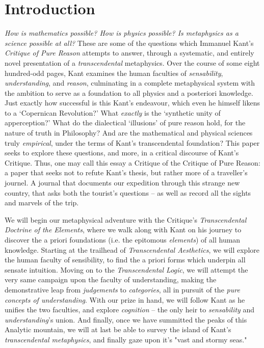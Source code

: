 \section*{Introduction}
\emph{How is mathematics possible? How is physics possible? Is metaphysics as a science possible at all?} These are some of the questions which Immanuel Kant's \emph{Critique of Pure Reason} attempts to answer, through a systematic, and entirely novel presentation of a \emph{transcendental} metaphysics. Over the course of some eight hundred-odd pages, Kant examines the human faculties of \emph{sensability}, \emph{understanding}, and \emph{reason}, culminating in a complete metaphysical system with the ambition to serve as a foundation to all physics and a posteriori knowledge. Just exactly how successful is this Kant's endeavour, which even he himself likens to a `Copernican Revolution?' What \emph{exactly} is the `synthetic unity of apperception?' What do the dialectical `illusions' of pure reason hold, for the nature of truth in Philosophy? And are the mathematical and physical sciences truly \emph{empirical}, under the terms of Kant's transcendental foundation? This paper seeks to explore these questions, and more, in a critical discourse of Kant's Critique. Thus, one may call this essay a Critique of the Critique of Pure Reason: a paper that seeks not to refute Kant's thesis, but rather more of a traveller's journel. A journal that documents our expedition through this strange new country, that asks both the tourist's questions -- as well as record all the sights and marvels of the trip.

We will begin our metaphysical adventure with the Critique's \emph{Transcendental Doctrine of the Elements}, where we walk along with Kant on his journey to discover the a priori foundations (i.e. the epitomous \emph{elements}) of all human knowledge. Starting at the trailhead of \emph{Transcendental Aesthetics}, we will explore the human faculty of sensibility, to find the a priori forms which underpin all sensate intuition. Moving on to the \emph{Transcendental Logic}, we will attempt the very same campaign upon the faculty of understanding, making the demonstrative leap from \emph{judgements} to \emph{categories}, all in pursuit of the \emph{pure concepts of understanding}. With our prize in hand, we will follow Kant as he unifies the two faculties, and explore \emph{cognition} -- the only heir to \emph{sensability} and \emph{understanding}'s union. And finally, once we have summitted the peaks of this Analytic mountain, we will at last be able to survey the island of Kant's \emph{transcendental metaphysics}, and finally gaze upon it's "vast and stormy seas."
